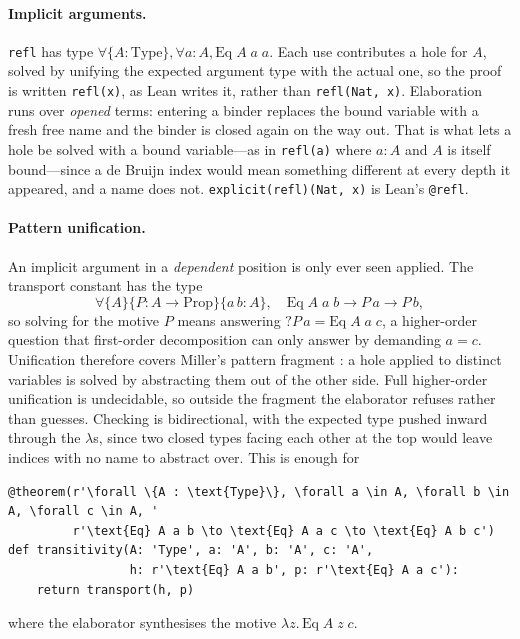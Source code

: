 \documentclass[11pt]{article}
\begin{document}
\paragraph{Implicit arguments.} \verb|refl| has type $\forall \{A{:}\mathrm{Type}\},
\forall a{:}A, \mathrm{Eq}\;A\;a\;a$. Each use contributes a hole for $A$, solved
by unifying the expected argument type with the actual one, so the proof is
written \verb|refl(x)|, as Lean writes it, rather than \verb|refl(Nat, x)|.
Elaboration runs over \emph{opened} terms: entering a binder replaces the bound
variable with a fresh free name and the binder is closed again on the way
out. That is what lets a hole be solved with a bound variable---as in
\verb|refl(a)| where $a{:}A$ and $A$ is itself bound---since a de Bruijn index
would mean something different at every depth it appeared, and a name does
not. \verb|explicit(refl)(Nat, x)| is Lean's \verb|@refl|.

\paragraph{Pattern unification.} An implicit argument in a \emph{dependent}
position is only ever seen applied. The transport constant has the type
\[\forall \{A\}\{P{:}A\to\mathrm{Prop}\}\{a\,b{:}A\},\quad
\mathrm{Eq}\;A\;a\;b \to P\,a \to P\,b,\]
so solving for the motive $P$ means answering $?P\,a = \mathrm{Eq}\;A\;a\;c$,
a higher-order question that first-order decomposition can only answer by
demanding $a = c$. Unification therefore covers Miller's pattern fragment
\cite{miller1991}: a hole applied to distinct variables is solved by abstracting
them out of the other side. Full higher-order unification is undecidable, so
outside the fragment the elaborator refuses rather than guesses. Checking is
bidirectional, with the expected type pushed inward through the $\lambda$s, since
two closed types facing each other at the top would leave indices with no name to
abstract over. This is enough for
\begin{lstlisting}
@theorem(r'\forall \{A : \text{Type}\}, \forall a \in A, \forall b \in A, \forall c \in A, '
         r'\text{Eq} A a b \to \text{Eq} A a c \to \text{Eq} A b c')
def transitivity(A: 'Type', a: 'A', b: 'A', c: 'A',
                 h: r'\text{Eq} A a b', p: r'\text{Eq} A a c'):
    return transport(h, p)
\end{lstlisting}
where the elaborator synthesises the motive $\lambda z.\,\mathrm{Eq}\;A\;z\;c$.
\end{document}
